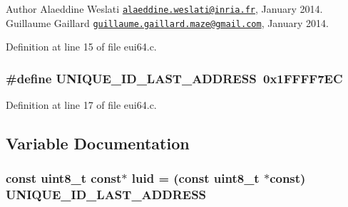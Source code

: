 \begin{DoxyAuthor}{Author}
Alaeddine Weslati \href{mailto:alaeddine.weslati@inria.fr}{\tt alaeddine.\+weslati@inria.\+fr}, January 2014.  Guillaume Gaillard \href{mailto:guillaume.gaillard.maze@gmail.com}{\tt guillaume.\+gaillard.\+maze@gmail.\+com}, January 2014. 
\end{DoxyAuthor}


Definition at line 15 of file eui64.\+c.

\subsubsection[{\texorpdfstring{U\+N\+I\+Q\+U\+E\+\_\+\+I\+D\+\_\+\+L\+A\+S\+T\+\_\+\+A\+D\+D\+R\+E\+SS}{UNIQUE_ID_LAST_ADDRESS}}]{\setlength{\rightskip}{0pt plus 5cm}\#define U\+N\+I\+Q\+U\+E\+\_\+\+I\+D\+\_\+\+L\+A\+S\+T\+\_\+\+A\+D\+D\+R\+E\+SS~0x1\+F\+F\+F\+F7\+EC}\hypertarget{iot-lab___a8-_m3_2eui64_8c_ab59ec9c178356b200db5d5f90253b1b9}{}\label{iot-lab___a8-_m3_2eui64_8c_ab59ec9c178356b200db5d5f90253b1b9}


Definition at line 17 of file eui64.\+c.



\subsection{Variable Documentation}
\subsubsection[{\texorpdfstring{luid}{luid}}]{\setlength{\rightskip}{0pt plus 5cm}const {\bf uint8\+\_\+t} const$\ast$ luid = (const {\bf uint8\+\_\+t} $\ast$const) {\bf U\+N\+I\+Q\+U\+E\+\_\+\+I\+D\+\_\+\+L\+A\+S\+T\+\_\+\+A\+D\+D\+R\+E\+SS}}\hypertarget{iot-lab___a8-_m3_2eui64_8c_abb80a3bafe316fa88843c9124c8c5783}{}\label{iot-lab___a8-_m3_2eui64_8c_abb80a3bafe316fa88843c9124c8c5783}


